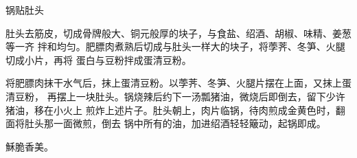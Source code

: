 \begin{recipe}{锅贴肚头}

\ingredients


\preparation

肚头去筋皮，切成骨牌般大、铜元般厚的块子，与食盐、绍酒、胡椒、味精、姜葱等一齐
拌和均匀。肥膘肉煮熟后切成与肚头一样大的块子，将荸荠、冬笋、火腿切成小片，再将
蛋白与豆粉拌成蛋清豆粉。

将肥膘肉抹干水气后，抹上蛋清豆粉。以荸荠、冬笋、火腿片摆在上面，又抹上蛋清豆粉，
再摆上一块肚头。锅烧辣后约下一汤瓢猪油，微烧后即倒去，留下少许猪油，移在小火上
煎炸上述片子。肚头朝上，肉片临锅，待肉煎成金黄色时，翻面将肚头那一面微煎，倒去
锅中所有的油，加进绍酒轻轻簸动，起锅即成。

\features

穌脆香美。

\end{recipe}

